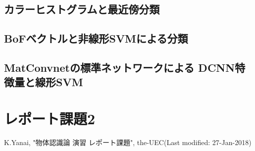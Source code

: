 \documentclass[11pt,a4paper, uplatex]{jsreport}
\begin{document}
\subsection{カラーヒストグラムと最近傍分類}



\subsection{BoFベクトルと非線形SVMによる分類}




\subsection{MatConvnetの標準ネットワークによる DCNN特徴量と線形SVM}



\section{レポート課題2}

\begin{thebibliography}{9}
   K.Yanai, "物体認識論 演習 レポート課題", the-UEC(Last modified: 27-Jan-2018)
\end{thebibliography}
\end{document}
